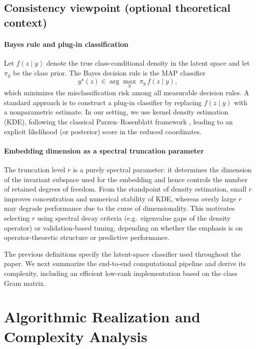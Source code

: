 \documentclass[preprint,11pt]{elsarticle}
\begin{document}
\subsection{Consistency viewpoint (optional theoretical context)}

\paragraph{Bayes rule and plug-in classification}
Let $f(z\mid y)$ denote the true class-conditional density in the latent space and let $\pi_y$ be the class prior.
The Bayes decision rule is the MAP classifier
\[
y^\star(z)\in \arg\max_{y}\ \pi_y\, f(z\mid y),
\]
which minimizes the misclassification risk among all measurable decision rules. A standard approach is to construct a plug-in classifier by
replacing $f(z\mid y)$ with a nonparametric estimate. In our setting, we use kernel density estimation (KDE), following the classical
Parzen--Rosenblatt framework \cite{Rosenblatt1956,Parzen1962,Silverman1986}, leading to an explicit likelihood (or posterior) score in the
reduced coordinates.

\paragraph{Embedding dimension as a spectral truncation parameter}
The truncation level $r$ is a purely spectral parameter: it determines the dimension of the invariant subspace used for the embedding and hence
controls the number of retained degrees of freedom. From the standpoint of density estimation, small $r$ improves concentration and numerical
stability of KDE, whereas overly large $r$ may degrade performance due to the curse of dimensionality. This motivates selecting $r$ using
spectral decay criteria (e.g.\ eigenvalue gaps of the density operator) or validation-based tuning, depending on whether the emphasis is on
operator-theoretic structure or predictive performance.

The previous definitions specify the latent-space classifier used throughout the paper.
We next summarize the end-to-end computational pipeline and derive its complexity, including an efficient low-rank implementation based on the class Gram matrix.


\section{Algorithmic Realization and Complexity Analysis}
\label{sec:algorithm}
\end{document}
